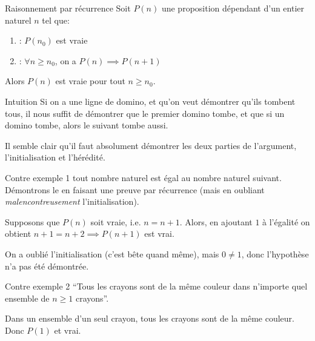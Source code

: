 \documentclass[a4paper]{article}
\begin{document}
\begin{parag}{Raisonnement par récurrence}
    Soit $P\left(n\right)$ une proposition dépendant d'un entier naturel $n$ tel que:
    \begin{enumerate}
        \item {}: $P\left(n_0\right)$ est vraie
        \item {}: $\forall n \geq n_0$, on a $P\left(n\right) \implies P\left(n +  1\right)$
    \end{enumerate}

    Alors $P\left(n\right)$ est vraie pour tout $n \geq n_0$.

    \begin{subparag}{Intuition}
        Si on a une ligne de domino, et qu'on veut démontrer qu'ils tombent tous, il nous suffit de démontrer que le premier domino tombe, et que si un domino tombe, alors le suivant tombe aussi.

        Il semble clair qu'il faut absolument démontrer les deux parties de l'argument, l'initialisation et l'hérédité.
    \end{subparag}

    \begin{subparag}{Contre exemple 1}
         tout nombre naturel est égal au nombre naturel suivant. Démontrons le en faisant une preuve par récurrence (mais en oubliant \textit{malencontreusement} l'initialisation). 

        \vspace{1em}
         Supposons que $P\left(n\right)$ soit vraie, i.e. $n = n+1$. Alors, en ajoutant $1$ à l'égalité on obtient $n+1 = n + 2 \implies P\left(n + 1\right)$ est vrai. 

        \vspace{1em}
         On a oublié l'initialisation (c'est bête quand même), mais $0 \neq 1$, donc l'hypothèse n'a pas été démontrée.
    \end{subparag}
    

    \begin{subparag}{Contre exemple 2}
         ``Tous les crayons sont de la même couleur dans n'importe quel ensemble de $n\geq 1$ crayons''. 

        \vspace{1em}

         Dans un ensemble d'un seul crayon, tous les crayons sont de la même couleur. Donc $P\left(1\right)$ et vrai.


\end{subparag}
\end{parag}
\end{document}
